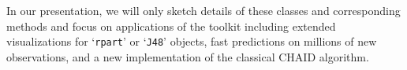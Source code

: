 \documentclass[10pt]{article}
\let\code=\texttt
\newcommand{\class}[1]{`\code{#1}'}
\begin{document}
In our presentation, we will only sketch details of these classes and 
corresponding methods and focus on applications of the toolkit including
extended visualizations for \class{rpart} or \class{J48} objects, fast predictions
on millions of new observations, and a new implementation of the classical CHAID
algorithm.



\end{document}
